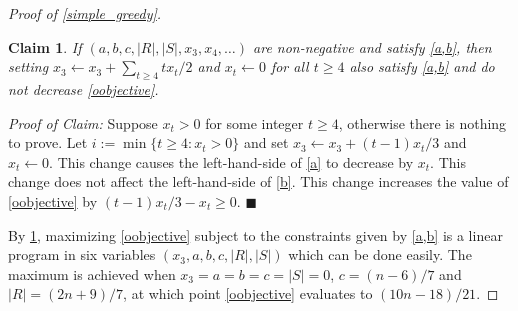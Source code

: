 \documentclass[a4paper,UKenglish,cleveref, autoref, thm-restate]{lipics-v2021}
\newtheorem{clm}{Claim}
\newenvironment{clmproof}{\noindent\emph{Proof of Claim:}}{\hfill{$\blacksquare$}\par}
\begin{document}
\begin{proof}[Proof of \cref{simple_greedy}]
  \begin{clm}\label{simplify}
    If $(a,b,c,|R|,|S|,x_3,x_4,\ldots)$ are non-negative and satisfy \cref{a,b}, then setting $x_3\gets x_3+\sum_{t\ge 4}tx_t/2$ and $x_t\gets 0$ for all $t\ge 4$ also satisfy \cref{a,b} and do not decrease \cref{oobjective}.
  \end{clm}

  \begin{clmproof}
    Suppose $x_t>0$ for some integer $t\ge 4$, otherwise there is nothing to prove.  Let $i:=\min\{t\ge 4: x_t>0\}$ and set $x_3\gets x_3+(t-1)x_t/3$ and $x_t\gets 0$. This change causes the left-hand-side of \cref{a} to decrease by $x_t$. This change does not affect the left-hand-side of \cref{b}.  This change increases the value of \cref{oobjective} by $(t-1)x_t/3-x_t\ge 0$.
  \end{clmproof}

  By \cref{simplify}, maximizing \cref{oobjective} subject to the constraints given by \cref{a,b} is a linear program in six variables $(x_3,a,b,c,|R|,|S|)$ which can be done easily.  The maximum is achieved when $x_3=a=b=c=|S|=0$, $c=(n-6)/7$ and $|R|=(2n+9)/7$, at which point \cref{oobjective} evaluates to $(10n-18)/21$.
\end{proof}
\end{document}

